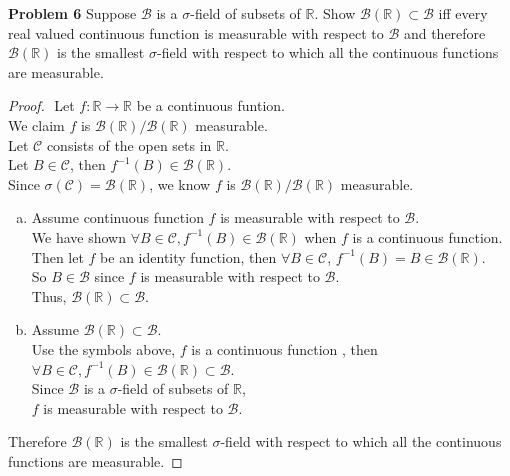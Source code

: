 \documentclass{article}
\newcommand{\llc}{\mathcal{C}}
\newcommand{\llb}{\mathcal{B}}
\newcommand{\bbr}{\mathbb{R}}
\begin{document}
\noindent \textbf{Problem 6} Suppose $\llb$ is a $\sigma$-field of subsets of $\bbr$. Show $\llb(\bbr) \subset \llb$ iff every real valued continuous function is measurable with respect to $\llb$ and therefore $\llb(\bbr)$ is the smallest $\sigma$-field with respect to which all the continuous functions are measurable.
\begin{proof}
	$ $\newline
	Let $f: \bbr \to \bbr $ be a continuous funtion.\\
	We claim $f$ is $\llb(\bbr)/\llb(\bbr)$ measurable. \\
	Let $\llc$ consists of the open sets in $\bbr$.\\
	Let $B \in \llc$, then $f^{-1}(B) \in \llb(\bbr)$.\\
	Since $\sigma(\llc) = \llb(\bbr)$, we know $f$ is $\llb(\bbr)/\llb(\bbr)$ measurable.
	\begin{enumerate}[(a)]
		\item 
			Assume continuous function $f$ is measurable with respect to $\llb$. \\
			We have shown $\forall B \in \llc, f^{-1}(B) \in \llb(\bbr)$ when $f$ is a continuous function.\\
			Then let $f$ be an identity function, then $\forall B \in \llc$, $f^{-1}(B) = B \in \llb(\bbr)$.\\
			So $B \in \llb$ since $f$ is measurable with respect to $\llb$.\\
			Thus, $\llb(\bbr) \subset \llb$.
		\item
			Assume $\llb(\bbr) \subset \llb$.\\
		    Use the symbols above, $f$ is a continuous function , then $\forall B \in \llc, f^{-1}(B) \in \llb(\bbr) \subset \llb$.\\
		    Since $\llb$ is a $\sigma$-field of subsets of $\bbr$,\\
		    $f$ is measurable with respect to $\llb$.
	\end{enumerate}
	Therefore $\llb(\bbr)$ is the smallest $\sigma$-field with respect to which all the continuous functions are measurable.
\end{proof}
\end{document}
